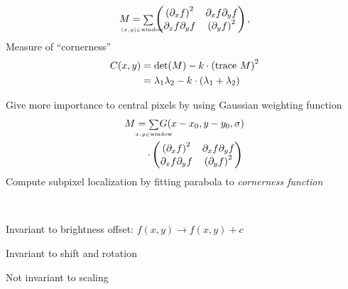 \begin{compactdesc}
\begin{gather*}
			M={\scriptstyle\sum\limits_{\mathclap{(x,y)\in \text{window}\quad\,\,}}}^{}
			\begin{pmatrix}
				\left( \partial_x f \right)^2&\partial_xf\partial_yf\\
				\partial_xf\partial_yf&\left( \partial_y f \right)^2
			\end{pmatrix},
		\end{gather*}
		Measure of ``cornerness''
		\begin{align*}
			C(x,y)&=\det(M)-k\cdot \left( \operatorname{trace}\, M \right)^2\\
			&=\lambda_1\lambda_2-k\cdot(\lambda_1+\lambda_2)
		\end{align*}
	\item[\lp{Corner importance weight}] Give more importance to central pixels by using Gaussian weighting function
		\begin{align*}
			M&={\scriptstyle\sum\limits_{\mathclap{x,y\in\text{window}}}}^{}G(x-x_0,y-y_0,\sigma)\\
			&\quad\cdot
			\begin{pmatrix}
				\left( \partial_xf \right)^2&\partial_xf\partial_yf\\
				\partial_xf\partial_yf&\left( \partial_yf \right)^2
			\end{pmatrix}
		\end{align*}
		Compute subpixel localization by fitting parabola to \emph{cornerness function}
	\item[\lp{Robustness of Harris corner detector}]\hfill\\
		\begin{enumerate*}[label=\protect\circled{\arabic*},itemjoin=]
			\item Invariant to brightness offset: $f(x,y)\to f(x,y)+c$\\
			\item Invariant to shift and rotation\\
			\item Not invariant to scaling\\
		\end{enumerate*}

\end{compactdesc}

